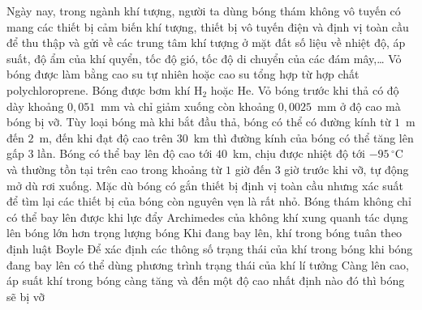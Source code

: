 	\begin{ex}%
		Ngày nay, trong ngành khí tượng, người ta dùng bóng thám không vô tuyến có mang các thiết bị cảm biến khí tượng, thiết bị vô tuyến điện và định vị toàn cầu để thu thập và gửi về các trung tâm khí tượng ở mặt đất số liệu về nhiệt độ, áp suất, độ ẩm của khí quyển, tốc độ gió, tốc độ di chuyển của các đám mây,\ldots{} Vỏ bóng được làm bằng cao su tự nhiên hoặc cao su tổng hợp từ hợp chất polychloroprene. Bóng được bơm khí $\text{H}_2$ hoặc He. Vỏ bóng trước khi thả có độ dày khoảng $0{,}051$~mm và chỉ giảm xuống còn khoảng $0{,}0025$~mm ở độ cao mà bóng bị vỡ. Tùy loại bóng mà khi bắt đầu thả, bóng có thể có đường kính từ $1$~m đến $2$~m, đến khi đạt độ cao trên $30$~km thì đường kính của bóng có thể tăng lên gấp $3$ lần. Bóng có thể bay lên độ cao tới $40$~km, chịu được nhiệt độ tới $-95\,^\circ\text{C}$ và thường tồn tại trên cao trong khoảng từ $1$ giờ đến $3$ giờ trước khi vỡ, tự động mở dù rơi xuống. Mặc dù bóng có gắn thiết bị định vị toàn cầu nhưng xác suất để tìm lại các thiết bị của bóng còn nguyên vẹn là rất nhỏ.
		\choiceTFt
		{\True Bóng thám không chỉ có thể bay lên được khi lực đẩy Archimedes của không khí xung quanh tác dụng lên bóng lớn hơn trọng lượng bóng}
		{Khi đang bay lên, khí trong bóng tuân theo định luật Boyle}
		{\True Để xác định các thông số trạng thái của khí trong bóng khi bóng đang bay lên có thể dùng phương trình trạng thái của khí lí tưởng}
		{Càng lên cao, áp suất khí trong bóng càng tăng và đến một độ cao nhất định nào đó thì bóng sẽ bị vỡ}
	\end{ex}

